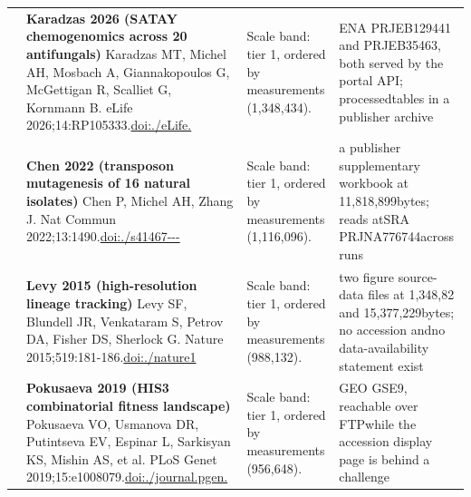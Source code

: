 \begin{landscape}
\begin{longtable}{@{}r@{\hspace{4pt}} L{78mm} L{72mm} L{76mm}@{}}
 & \textbf{Karadzas 2026 (SATAY chemogenomics across 20 antifungals)} \newline Karadzas MT, Michel AH, Mosbach A, Giannakopoulos G, McGettigan R, Scalliet G, Kornmann B. eLife 2026;14:RP105333.\newline \href{https://doi.org/10.7554/eLife.105333}{doi:./\allowbreak eLife.} & Scale band: tier 1, ordered by measurements (1,348,434). & ENA PRJE\allowbreak B129441 \allowbreak and PRJE\allowbreak B35463, \allowbreak both ser\allowbreak ved by t\allowbreak he porta\allowbreak l API; p\allowbreak rocessed\allowbreak  tables \allowbreak in a pub\allowbreak lisher a\allowbreak rchive \\
 & \textbf{Chen 2022 (transposon mutagenesis of 16 natural isolates)} \newline Chen P, Michel AH, Zhang J. Nat Commun 2022;13:1490.\newline \href{https://doi.org/10.1038/s41467-022-29228-1}{doi:./\allowbreak s41467---} & Scale band: tier 1, ordered by measurements (1,116,096). & a publis\allowbreak her supp\allowbreak lementar\allowbreak y workbo\allowbreak ok at 11\allowbreak ,818,899\allowbreak  bytes; \allowbreak reads at\allowbreak  SRA PRJ\allowbreak NA776744\allowbreak  across  runs \\
 & \textbf{Levy 2015 (high-resolution lineage tracking)} \newline Levy SF, Blundell JR, Venkataram S, Petrov DA, Fisher DS, Sherlock G. Nature 2015;519:181-186.\newline \href{https://doi.org/10.1038/nature14279}{doi:./\allowbreak nature1} & Scale band: tier 1, ordered by measurements (988,132). & two figu\allowbreak re sourc\allowbreak e-\allowbreak data fi\allowbreak les at 1,348,82 and 15\allowbreak ,377,229\allowbreak  bytes; \allowbreak no acces\allowbreak sion and\allowbreak  no data\allowbreak -\allowbreak availab\allowbreak ility st\allowbreak atement \allowbreak exist \\
 & \textbf{Pokusaeva 2019 (HIS3 combinatorial fitness landscape)} \newline Pokusaeva VO, Usmanova DR, Putintseva EV, Espinar L, Sarkisyan KS, Mishin AS, et al. PLoS Genet 2019;15:e1008079.\newline \href{https://doi.org/10.1371/journal.pgen.1008079}{doi:./\allowbreak journal\allowbreak .\allowbreak pgen.} & Scale band: tier 1, ordered by measurements (956,648). & GEO GSE9, re\allowbreak achable \allowbreak over FTP\allowbreak  while t\allowbreak he acces\allowbreak sion dis\allowbreak play pag\allowbreak e is beh\allowbreak ind a ch\allowbreak allenge \\

\end{longtable}
\end{landscape}
